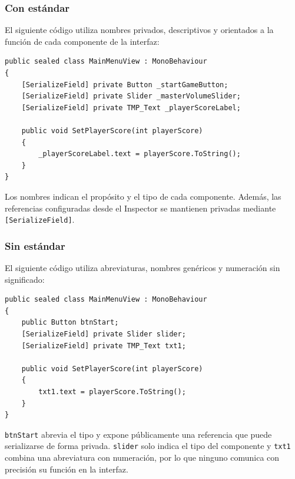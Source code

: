 \subsubsection{Con estándar}

El siguiente código utiliza nombres privados, descriptivos y orientados a la función de cada componente de la interfaz:

\begin{lstlisting}[style=csharpstyle]
public sealed class MainMenuView : MonoBehaviour
{
    [SerializeField] private Button _startGameButton;
    [SerializeField] private Slider _masterVolumeSlider;
    [SerializeField] private TMP_Text _playerScoreLabel;

    public void SetPlayerScore(int playerScore)
    {
        _playerScoreLabel.text = playerScore.ToString();
    }
}
\end{lstlisting}

Los nombres indican el propósito y el tipo de cada componente. Además, las referencias configuradas desde el Inspector se mantienen privadas mediante \texttt{[SerializeField]}.

\newpage

\subsubsection{Sin estándar}

El siguiente código utiliza abreviaturas, nombres genéricos y numeración sin significado:

\begin{lstlisting}[style=csharpstyle]
public sealed class MainMenuView : MonoBehaviour
{
    public Button btnStart;
    [SerializeField] private Slider slider;
    [SerializeField] private TMP_Text txt1;

    public void SetPlayerScore(int playerScore)
    {
        txt1.text = playerScore.ToString();
    }
}
\end{lstlisting}

\texttt{btnStart} abrevia el tipo y expone públicamente una referencia que puede serializarse de forma privada. \texttt{slider} solo indica el tipo del componente y \texttt{txt1} combina una abreviatura con numeración, por lo que ninguno comunica con precisión su función en la interfaz.
